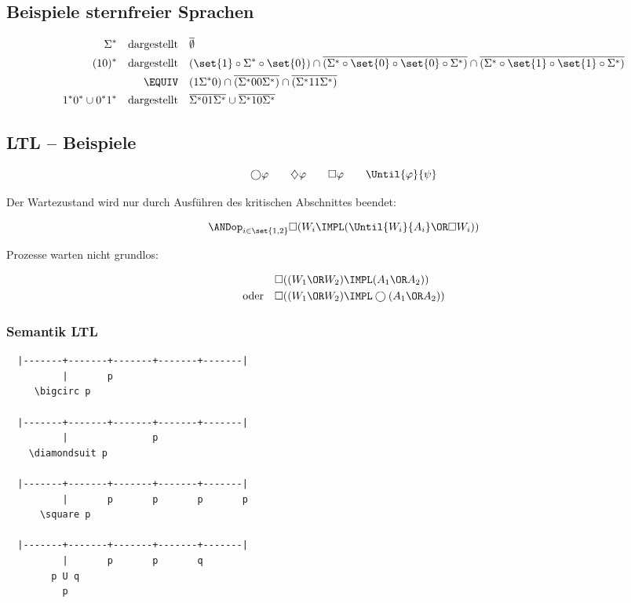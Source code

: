 \subsection{Beispiele sternfreier Sprachen}

\begin{align*}
  \Sigma^* 
    \quad\text{dargestellt}\quad&
    \overline{\emptyset} \\
  (10)^* 
    \quad\text{dargestellt}\quad&
    (\set{1}\circ\Sigma^*\circ\set{0}) \cap
      \overline{(\Sigma^*\circ\set{0}\circ\set{0}\circ\Sigma^*)} \cap
      \overline{(\Sigma^*\circ\set{1}\circ\set{1}\circ\Sigma^*)} \\
    \EQUIV\quad&
      (1\Sigma^*0) \cap \overline{(\Sigma^*00\Sigma^*)} \cap \overline{(\Sigma^*11\Sigma^*)} \\
  1^*0^*\cup 0^*1^*
    \quad\text{dargestellt}\quad&
    \overline{\Sigma^*01\Sigma^*} \cup \overline{\Sigma^*10\Sigma^*}
\end{align*}

\subsection{LTL -- Beispiele}

\[
  \bigcirc\varphi \qquad \diamondsuit\varphi \qquad \square\varphi \qquad \Until{\varphi}{\psi}
\]

Der Wartezustand wird nur durch Ausführen des kritischen Abschnittes beendet:

\[
  \ANDop_{i\in\set{1,2}} \square (W_i \IMPL (\Until{W_i}{A_i} \OR \square W_i))
\]

Prozesse warten nicht grundlos:

\begin{align*}
                    & \square ((W_1\OR W_2) \IMPL (A_1\OR A_2)) \\
  \text{oder} \quad & \square ((W_1\OR W_2) \IMPL \bigcirc(A_1\OR A_2))
\end{align*}

\subsubsection{Semantik LTL}

\begin{verbatim}
  |-------+-------+-------+-------+-------|
          |       p
     \bigcirc p

  |-------+-------+-------+-------+-------|
          |               p
    \diamondsuit p

  |-------+-------+-------+-------+-------|
          |       p       p       p       p
      \square p

  |-------+-------+-------+-------+-------|
          |       p       p       q
        p U q
          p
\end{verbatim}

